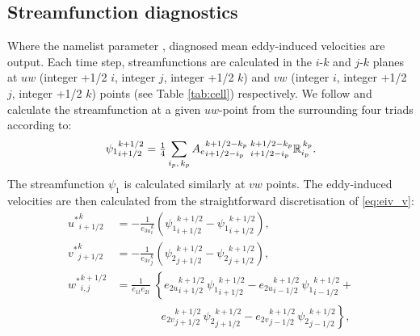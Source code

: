 \documentclass[../tex_main/NEMO_manual]{subfiles}
\begin{document}
\subsection{Streamfunction diagnostics}\label{sec:sfdiag}
Where the namelist parameter ,
diagnosed mean eddy-induced velocities are output.
Each time step, streamfunctions are calculated in the $i$-$k$ and $j$-$k$ planes at
$uw$ (integer +1/2 $i$, integer $j$, integer +1/2 $k$) and $vw$ (integer $i$, integer +1/2 $j$, integer +1/2 $k$)
points (see Table \autoref{tab:cell}) respectively.
We follow \citep{Griffies_Bk04} and calculate the streamfunction at a given $uw$-point from
the surrounding four triads according to:
\begin{equation}
  \label{eq:sfdiagi}
  {\psi_1}_{i+1/2}^{k+1/2}={\textstyle\frac{1}{4}}\sum_{\substack{i_p,\,k_p}}
  {A_e}_{i+1/2-i_p}^{k+1/2-k_p}\:{}_{i+1/2-i_p}^{k+1/2-k_p}{\mathbb{R}}_{i_p}^{\,k_p}.
\end{equation}
The streamfunction $\psi_1$ is calculated similarly at $vw$ points.
The eddy-induced velocities are then calculated from the straightforward discretisation of \autoref{eq:eiv_v}:
\begin{equation}\label{eq:eiv_v_discrete}
\begin{split}
 {u^*}_{i+1/2}^{k} & = - \frac{1}{{e_{3u}}_{i}^{k}}\left({\psi_1}_{i+1/2}^{k+1/2}-{\psi_1}_{i+1/2}^{k+1/2}\right),   \\
 {v^*}_{j+1/2}^{k} & = - \frac{1}{{e_{3v}}_{j}^{k}}\left({\psi_2}_{j+1/2}^{k+1/2}-{\psi_2}_{j+1/2}^{k+1/2}\right),   \\
 {w^*}_{i,j}^{k+1/2} & =    \frac{1}{e_{1t}e_{2t}}\; \left\{
 {e_{2u}}_{i+1/2}^{k+1/2} \,{\psi_1}_{i+1/2}^{k+1/2} -
 {e_{2u}}_{i-1/2}^{k+1/2} \,{\psi_1}_{i-1/2}^{k+1/2} \right. + \\
\phantom{=} & \qquad\qquad\left. {e_{2v}}_{j+1/2}^{k+1/2} \,{\psi_2}_{j+1/2}^{k+1/2} - {e_{2v}}_{j-1/2}^{k+1/2} \,{\psi_2}_{j-1/2}^{k+1/2} \right\},
\end{split}
\end{equation}
\end{document}
